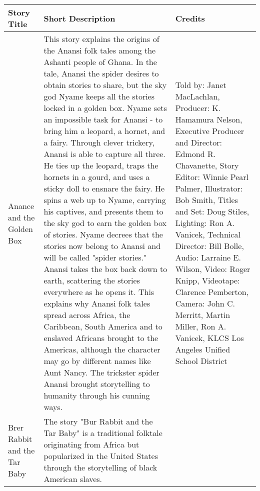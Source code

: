 \begin{table}[h]
    \centering
    \begin{small}

        \begin{tabular}{|p{1.5cm}|p{8.5cm}|p{7cm}|}
            \hline
            \textbf{Story Title} & \textbf{Short Description} & \textbf{Credits} \\
            \hline
            Anance and the Golden Box
                                 &
            This story explains the origins of the Anansi folk tales among the Ashanti people of Ghana.
            In the tale, Anansi the spider desires to obtain stories to share, but the sky god Nyame keeps all the stories locked in a golden box.
            Nyame sets an impossible task for Anansi - to bring him a leopard, a hornet, and a fairy.
            Through clever trickery, Anansi is able to capture all three.
            He ties up the leopard, traps the hornets in a gourd, and uses a sticky doll to ensnare the fairy.
            He spins a web up to Nyame, carrying his captives, and presents them to the sky god to earn the golden box of stories.
            Nyame decrees that the stories now belong to Anansi and will be called "spider stories."
            Anansi takes the box back down to earth, scattering the stories everywhere as he opens it.
            This explains why Anansi folk tales spread across Africa, the Caribbean, South America and to enslaved Africans brought to the Americas, although the character may go by different names like Aunt Nancy.
            The trickster spider Anansi brought storytelling to humanity through his cunning ways.
                                 &
            Told by: Janet MacLachlan,
            Producer: K. Hamamura Nelson,
            Executive Producer and Director: Edmond R. Chavanette,
            Story Editor: Winnie Pearl Palmer,
            Illustrator: Bob Smith,
            Titles and Set: Doug Stiles,
            Lighting: Ron A. Vanicek,
            Technical Director: Bill Bolle,
            Audio: Larraine E. Wilson,
            Video: Roger Knipp,
            Videotape: Clarence Pemberton,
            Camera: John C. Merritt, Martin Miller, Ron A. Vanicek,
            KLCS Los Angeles Unified School District
            \\
            \hline
            Brer Rabbit and the Tar Baby
                                 &
            The story "Bur Rabbit and the Tar Baby" is a traditional folktale originating from Africa but popularized in the United States through the storytelling of black American slaves.

\end{tabular}
\end{small}
\end{table}
